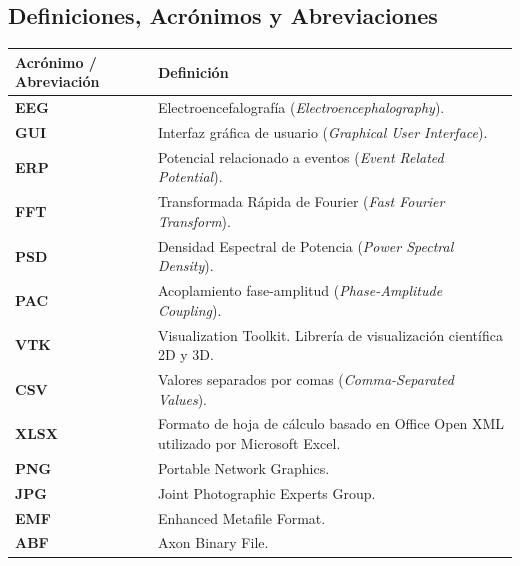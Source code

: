 \documentclass[12pt, letterpaper]{article}
\renewcommand{\arraystretch}{1.35}
\begin{document}
\subsection{Definiciones, Acrónimos y Abreviaciones}
\begin{table}[ht]
\centering
\renewcommand{\arraystretch}{1.1}
\small

\begin{tabular}{|p{4cm}|p{10cm}|}
\hline
\textbf{Acrónimo / Abreviación} & \textbf{Definición} \\ \hline

\textbf{EEG} & Electroencefalografía (\textit{Electroencephalography}). \\ \hline

\textbf{GUI} & Interfaz gráfica de usuario (\textit{Graphical User Interface}). \\ \hline

\textbf{ERP} & Potencial relacionado a eventos (\textit{Event Related Potential}). \\ \hline

\textbf{FFT} & Transformada Rápida de Fourier (\textit{Fast Fourier Transform}). \\ \hline

\textbf{PSD} & Densidad Espectral de Potencia (\textit{Power Spectral Density}). \\ \hline

\textbf{PAC} & Acoplamiento fase-amplitud (\textit{Phase-Amplitude Coupling}). \\ \hline

\textbf{VTK} & Visualization Toolkit. Librería de visualización científica 2D y 3D. \\ \hline

\textbf{CSV} & Valores separados por comas (\textit{Comma-Separated Values}). \\ \hline

\textbf{XLSX} & Formato de hoja de cálculo basado en Office Open XML utilizado por Microsoft Excel. \\ \hline

\textbf{PNG} & Portable Network Graphics. \\ \hline

\textbf{JPG} & Joint Photographic Experts Group. \\ \hline

\textbf{EMF} & Enhanced Metafile Format. \\ \hline

\textbf{ABF} & Axon Binary File. \\ \hline


\end{tabular}
\end{table}
\end{document}
